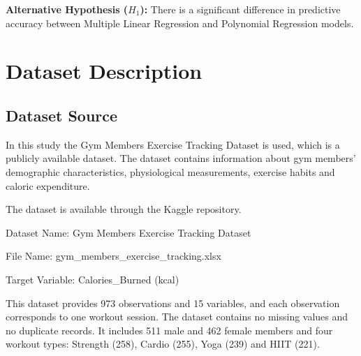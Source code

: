 \documentclass[12pt,a4paper]{report}
\begin{document}
\noindent\textbf{Alternative Hypothesis ($H_1$):} There is a significant difference in predictive accuracy between Multiple Linear Regression and Polynomial Regression models.

\chapter{Dataset Description}
\section{Dataset Source}
In this study the Gym Members Exercise Tracking Dataset is used, which is a publicly available dataset. The dataset contains information about gym members' demographic characteristics, physiological measurements, exercise habits and caloric expenditure.

The dataset is available through the Kaggle repository.

\noindent Dataset Name: Gym Members Exercise Tracking Dataset

\noindent File Name: gym\_members\_exercise\_tracking.xlsx

\noindent Target Variable: Calories\_Burned (kcal)

This dataset provides 973 observations and 15 variables, and each observation corresponds to one workout session. The dataset contains no missing values and no duplicate records. It includes 511 male and 462 female members and four workout types: Strength (258), Cardio (255), Yoga (239) and HIIT (221).
\end{document}
